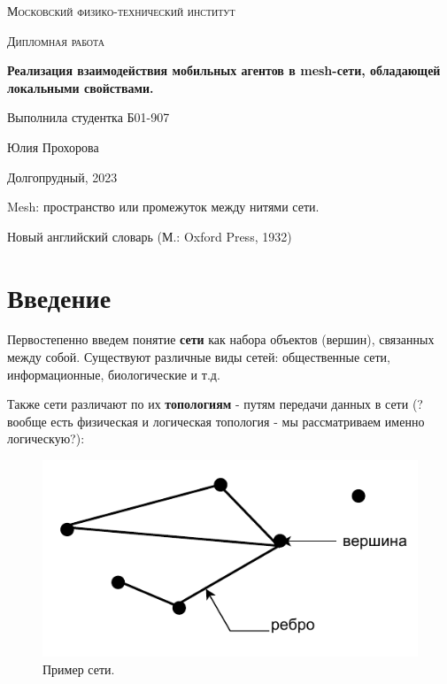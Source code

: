 \documentclass[a4paper]{article}
\begin{document}
\newcommand{\apple}{\char"F8FF}



\begin{titlepage}
    \vspace*{4cm}
	\centering
    {\scshape\LARGE Московский физико-технический институт\par}
	\vspace{1cm}
	{\scshape\Large Дипломная работа\par}
	\vspace{1cm}
    {\huge\bfseries Реализация взаимодействия мобильных агентов в mesh-сети,  обладающей  локальными свойствами. \par}
	\vspace{2cm}
	\vfill
\begin{flushright}
	{\large Выполнила студентка Б01-907}\par
	\vspace{0.3cm}
	{\LARGE Юлия Прохорова}
\end{flushright}
	
	\vfill
Долгопрудный, 2023
\end{titlepage}

\pagestyle{fancy} 
\fancyhead[C]{}
\fancyfoot[C]{ \noindent\rule{\textwidth}{0.4pt} \thepage }

\tableofcontents

\newpage

\epigraph{Mesh: пространство или промежуток между нитями сети.}{Новый английский словарь (М.: Oxford Press, 1932)}

\section{Введение}
Первостепенно введем понятие \textbf{сети} как набора объектов (вершин), связанных между собой. Существуют различные виды сетей: общественные сети, информационные, биологические и т.д. \par
Также сети различают по их \textbf{топологиям} - путям передачи данных в сети (?вообще есть физическая и логическая топология - мы рассматриваем именно логическую?):

\begin{figure}[H]
	\begin{center}
	\includegraphics[width=0.4\linewidth]{net.pdf}
	\caption{Пример сети.} 
    \label{p1}
    \end {center}
\end{figure}
\end{document}
